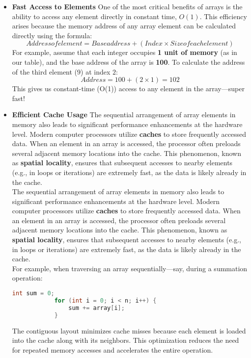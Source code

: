 \documentclass[12pt, oneside]{book}
\begin{document}
	\begin{itemize}
		\item \textbf{Fast Access to Elements}
		One of the most critical benefits of arrays is the ability to access any element directly in constant time, \(O(1)\). This efficiency arises because the memory address of any array element can be calculated directly using the formula:  
		\[
		{Address of element} = {Base address} + ({Index} \times {Size of each element})
		\]
		For example, assume that each integer occupies \textbf{1 unit of memory} (as in our table), and the base address of the array is \textbf{100}. To calculate the address of the third element (\(9\)) at index \(2\):
		\[
		{Address} = 100 + (2 \times 1) = 102
		\]
		This gives us constant-time (O(1)) access to any element in the array—super fast!
		
		\item \textbf{Efficient Cache Usage}
		The sequential arrangement of array elements in memory also leads to significant performance enhancements at the hardware level. Modern computer processors utilize \textbf{caches} to store frequently accessed data. When an element in an array is accessed, the processor often preloads several adjacent memory locations into the cache. This phenomenon, known as \textbf{spatial locality}, ensures that subsequent accesses to nearby elements (e.g., in loops or iterations) are extremely fast, as the data is likely already in the cache.\\
		The sequential arrangement of array elements in memory also leads to significant performance enhancements at the hardware level. Modern computer processors utilize \textbf{caches} to store frequently accessed data. When an element in an array is accessed, the processor often preloads several adjacent memory locations into the cache. This phenomenon, known as \textbf{spatial locality}, ensures that subsequent accesses to nearby elements (e.g., in loops or iterations) are extremely fast, as the data is likely already in the cache.\\
		
		For example, when traversing an array sequentially—say, during a summation operation:
		\begin{lstlisting}[language=C]
			int sum = 0;
			for (int i = 0; i < n; i++) {
				sum += array[i];
			}
		\end{lstlisting}
		The contiguous layout minimizes cache misses because each element is loaded into the cache along with its neighbors. This optimization reduces the need for repeated memory accesses and accelerates the entire operation.
	\end{itemize}
	
\end{document}

